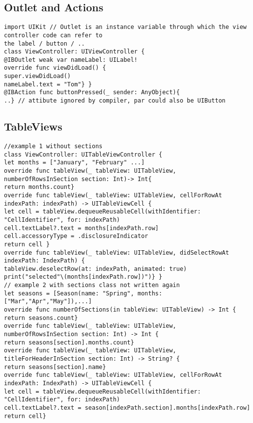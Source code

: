 \subsection{Outlet and Actions}
\begin{lstlisting}
import UIKit // Outlet is an instance variable through which the view controller code can refer to
the label / button / ..
class ViewController: UIViewController {
@IBOutlet weak var nameLabel: UILabel!
override func viewDidLoad() {
super.viewDidLoad()
nameLabel.text = "Tom"} }
@IBAction func buttonPressed(_ sender: AnyObject){
..} // attibute ignored by compiler, par could also be UIButton
\end{lstlisting}

\subsection{TableViews}
\begin{lstlisting}
//example 1 without sections
class ViewController: UITableViewController {
let months = ["January", "February" ...]
override func tableView(_ tableView: UITableView, numberOfRowsInSection section: Int)-> Int{
return months.count}
override func tableView(_ tableView: UITableView, cellForRowAt indexPath: indexPath) -> UITableViewCell {
let cell = tableView.dequeueReusableCell(withIdentifier: "CellIdentifier", for: indexPath)
cell.textLabel?.text = months[indexPath.row]
cell.accessoryType = .disclosureIndicator
return cell }
override func tableView(_ tableView: UITableView, didSelectRowAt indexPath: IndexPath) {
tableView.deselectRow(at: indexPath, animated: true)
print("selected"\(months[indexPath.row])")} }
// example 2 with sections class not written again
let seasons = [Season(name: "Spring", months: ["Mar","Apr","May"]),...]
override func numberOfSections(in tableView: UITableView) -> Int { return seasons.count}
override func tableView(_ tableView: UITableView, numberOfRowsInSection section: Int) -> Int {
return seasons[section].months.count}
override func tableView(_ tableView: UITableView, titleForHeaderInSection section: Int) -> String? {
return seasons[section].name}
override func tableView(_ tableView: UITableView, cellForRowAt indexPath: IndexPath) -> UITableViewCell {
let cell = tableView.dequeueReusableCell(withIdentifier: "CellIdentifier", for: indexPath)
cell.textLabel?.text = season[indexPath.section].months[indexPath.row]
return cell}
\end{lstlisting}

